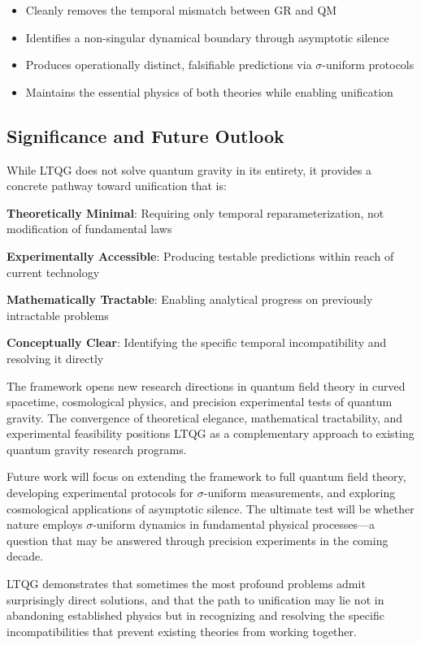 \documentclass[12pt,a4paper]{article}
\begin{document}
\begin{itemize}
\item Cleanly removes the temporal mismatch between GR and QM
\item Identifies a non-singular dynamical boundary through asymptotic silence  
\item Produces operationally distinct, falsifiable predictions via $\sigma$-uniform protocols
\item Maintains the essential physics of both theories while enabling unification
\end{itemize}

\subsection{Significance and Future Outlook}

While LTQG does not solve quantum gravity in its entirety, it provides a concrete pathway toward unification that is:

\textbf{Theoretically Minimal}: Requiring only temporal reparameterization, not modification of fundamental laws

\textbf{Experimentally Accessible}: Producing testable predictions within reach of current technology

\textbf{Mathematically Tractable}: Enabling analytical progress on previously intractable problems

\textbf{Conceptually Clear}: Identifying the specific temporal incompatibility and resolving it directly

The framework opens new research directions in quantum field theory in curved spacetime, cosmological physics, and precision experimental tests of quantum gravity. The convergence of theoretical elegance, mathematical tractability, and experimental feasibility positions LTQG as a complementary approach to existing quantum gravity research programs.

Future work will focus on extending the framework to full quantum field theory, developing experimental protocols for $\sigma$-uniform measurements, and exploring cosmological applications of asymptotic silence. The ultimate test will be whether nature employs $\sigma$-uniform dynamics in fundamental physical processes—a question that may be answered through precision experiments in the coming decade.

LTQG demonstrates that sometimes the most profound problems admit surprisingly direct solutions, and that the path to unification may lie not in abandoning established physics but in recognizing and resolving the specific incompatibilities that prevent existing theories from working together.
\end{document}
